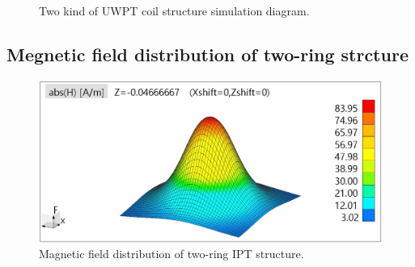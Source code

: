 \begin{figure}[!t]
    \caption{Two kind of UWPT coil structure simulation diagram.}
    \label{fig: two strcture}
\end{figure}

\subsection{Megnetic field distribution of two-ring strcture}

\begin{figure}[!t]
    \centering
    \includegraphics[width=0.9\linewidth]{images/4_two_ring_near_field_distribution.JPG}
    \caption{Magnetic field distribution of two-ring IPT structure.}
    \label{fig: magnetic distribution of two ring}
\end{figure}

